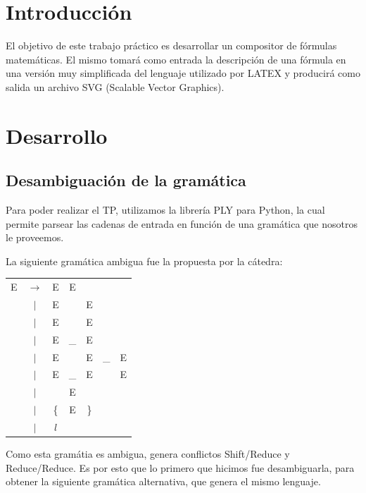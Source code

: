 \documentclass[a4paper, 10pt, twoside]{article}
\begin{document}
\newpage

\tableofcontents

\newpage


\section{Introducción}
El objetivo de este trabajo práctico es desarrollar un compositor de fórmulas matemáticas. El mismo tomará como entrada la descripción de una fórmula en una versión muy simplificada del lenguaje utilizado por LATEX y producirá como salida un archivo SVG (Scalable Vector Graphics).

\section{Desarrollo}

\subsection{Desambiguación de la gramática}
Para poder realizar el TP, utilizamos la librería PLY para Python, la cual permite parsear las cadenas
de entrada en función de una gramática que nosotros le proveemos.

La siguiente gramática ambigua fue la propuesta por la cátedra:

\begin{table}[ht]
\begin{tabular} {c c c c c c c}

E & $\rightarrow$ & E & E                 &   & & \\
  & $|$           & E & \detokenize{/}    & E & & \\
  & $|$           & E & \detokenize{^}    & E & & \\
  & $|$           & E & \_                & E & & \\
  & $|$           & E & \detokenize{^}    & E & \_  & E \\
  & $|$           & E & \_                & E & \detokenize{^} & E \\
  & $|$           & \detokenize{(}        & E & \detokenize{)} & & \\
  & $|$           & \{        & E & \} & & \\
  & $|$           & $l$ & & & & \\
\end{tabular}
\end{table}

Como esta gramátia es ambigua, genera conflictos Shift/Reduce y Reduce/Reduce. Es por esto que lo primero que hicimos fue desambiguarla, para obtener la siguiente gramática alternativa,
que genera el mismo lenguaje.
\end{document}
